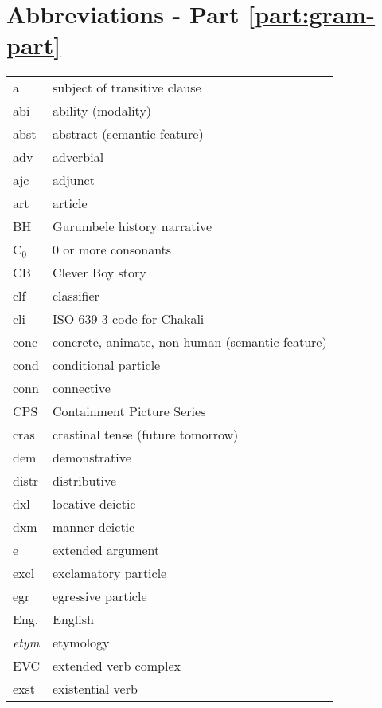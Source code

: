 
\chapter*{Abbreviations - Part \ref{part:gram-part}}
\label{sec-ABB}



 \begin{tabular}{ll}


{\sc a} & subject of transitive clause\\
{\sc abi} & ability (modality)\\
 {\sc abst} & abstract (semantic feature)\\
 {\sc adv} & adverbial  \\
  {\sc ajc} & adjunct  \\
{\sc art} &  article\\

BH & Gurumbele history narrative\\

C$_0$ & 0 or more consonants\\

CB  & Clever Boy story\\
{\sc clf} & classifier\\
cli & ISO 639-3 code for Chakali\\
 {\sc conc} & concrete, animate, non-human (semantic feature)\\
 {\sc cond} & conditional particle\\
 {\sc conn} &  connective\\
CPS & Containment Picture Series\\
 {\sc cras} & crastinal tense (future tomorrow) \\

 {\sc dem} & demonstrative \\
 {\sc distr} & distributive \\
{\sc dxl} & locative deictic\\
{\sc dxm} & manner deictic\\
{\sc e} & extended argument\\
{\sc excl} & exclamatory particle\\
{\sc egr} & egressive particle\\
Eng. & English\\
{\it etym} & etymology\\
EVC & extended verb complex\\
{\sc exst} & existential verb\\



\end{tabular}
